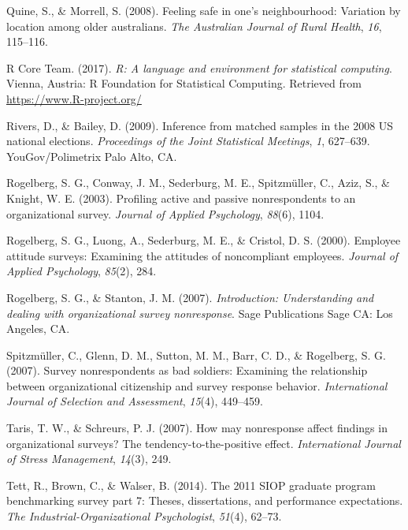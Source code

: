 \documentclass[
  ,man,floatsintext]{apa6}
\newlength{\cslhangindent}
\newlength{\cslentryspacingunit} %
\newenvironment{CSLReferences}[2] %
 {%
  \setlength{\parindent}{0pt}
  \ifodd #1
  \let\oldpar\par
  \def\par{\hangindent=\cslhangindent\oldpar}
  \fi
  \setlength{\parskip}{#2\cslentryspacingunit}
 }%
 {}
\begin{document}
\begin{CSLReferences}{1}{0}
\leavevmode{}%
Quine, S., \& Morrell, S. (2008). Feeling safe in one's neighbourhood: Variation by location among older australians. \emph{The Australian Journal of Rural Health}, \emph{16}, 115--116.

\leavevmode{}%
R Core Team. (2017). \emph{R: A language and environment for statistical computing}. Vienna, Austria: R Foundation for Statistical Computing. Retrieved from \url{https://www.R-project.org/}

\leavevmode{}%
Rivers, D., \& Bailey, D. (2009). Inference from matched samples in the 2008 {US} national elections. \emph{Proceedings of the Joint Statistical Meetings}, \emph{1}, 627--639. {YouGov}/Polimetrix Palo Alto, {CA}.

\leavevmode{}%
Rogelberg, S. G., Conway, J. M., Sederburg, M. E., Spitzmüller, C., Aziz, S., \& Knight, W. E. (2003). Profiling active and passive nonrespondents to an organizational survey. \emph{Journal of Applied Psychology}, \emph{88}(6), 1104.

\leavevmode{}%
Rogelberg, S. G., Luong, A., Sederburg, M. E., \& Cristol, D. S. (2000). Employee attitude surveys: Examining the attitudes of noncompliant employees. \emph{Journal of Applied Psychology}, \emph{85}(2), 284.

\leavevmode{}%
Rogelberg, S. G., \& Stanton, J. M. (2007). \emph{Introduction: Understanding and dealing with organizational survey nonresponse}. Sage Publications Sage {CA}: Los Angeles, {CA}.

\leavevmode{}%
Spitzmüller, C., Glenn, D. M., Sutton, M. M., Barr, C. D., \& Rogelberg, S. G. (2007). Survey nonrespondents as bad soldiers: Examining the relationship between organizational citizenship and survey response behavior. \emph{International Journal of Selection and Assessment}, \emph{15}(4), 449--459.

\leavevmode{}%
Taris, T. W., \& Schreurs, P. J. (2007). How may nonresponse affect findings in organizational surveys? The tendency-to-the-positive effect. \emph{International Journal of Stress Management}, \emph{14}(3), 249.

\leavevmode{}%
Tett, R., Brown, C., \& Walser, B. (2014). The 2011 {SIOP} graduate program benchmarking survey part 7: Theses, dissertations, and performance expectations. \emph{The Industrial-Organizational Psychologist}, \emph{51}(4), 62--73.


\end{CSLReferences}
\end{document}
